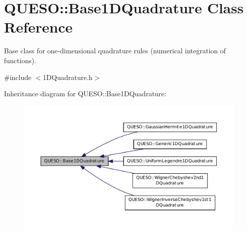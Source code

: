 \hypertarget{class_q_u_e_s_o_1_1_base1_d_quadrature}{\section{Q\-U\-E\-S\-O\-:\-:Base1\-D\-Quadrature Class Reference}
\label{class_q_u_e_s_o_1_1_base1_d_quadrature}
}


Base class for one-\/dimensional quadrature rules (numerical integration of functions).  




{\ttfamily \#include $<$1\-D\-Quadrature.\-h$>$}



Inheritance diagram for Q\-U\-E\-S\-O\-:\-:Base1\-D\-Quadrature\-:
\nopagebreak
\begin{figure}[H]
\begin{center}
\leavevmode
\includegraphics[width=350pt]{class_q_u_e_s_o_1_1_base1_d_quadrature__inherit__graph}
\end{center}
\end{figure}
